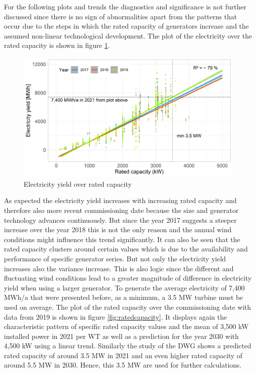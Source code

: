 \documentclass[a4paper,11pt]{article}
\begin{document}
For the following plots and trends the diagnostics and significance is not further discussed since there is no sign of abnormalities apart from the patterns that occur due to the steps in which the rated capacity of generators increase and the assumed non-linear technological development. The plot of the electricity over the rated capacity is shown in figure \ref{fig:eratedcapacity}.
\begin{figure}[H]

{\centering \includegraphics[width=1\linewidth]{data/Amprion/results_of_analysis/electricity_rated_capacity} 

}

\caption{Electricity yield over rated capacity}\label{fig:eratedcapacity}
\end{figure}
As expected the electricity yield increases with increasing rated capacity and therefore also more recent commissioning date because the size and generator technology advances continuously. But since the year 2017 suggests a steeper increase over the year 2018 this is not the only reason and the annual wind conditions might influence this trend significantly. It can also be seen that the rated capacity clusters around certain values which is due to the availability and performance of specific generator series. But not only the electricity yield increases also the variance increase. This is also logic since the different and fluctuating wind conditions lead to a greater magnitude of difference in electricity yield when using a larger generator. To generate the average electricity of 7,400 MWh/a that were presented before, as a minimum, a 3.5 MW turbine must be used on average. The plot of the rated capacity over the commissioning date with data from 2019 is shown in figure \ref{fig:ratedcapacity}. It displays again the characteristic pattern of specific rated capacity values and the mean of 3,500 kW installed power in 2021 per WT as well as a prediction for the year 2030 with 4,500 kW using a linear trend. Similarly the study of the DWG shows a predicted rated capacity of around 3.5 MW in 2021 and an even higher rated capacity of around 5.5 MW in 2030. Hence, this 3.5 MW are used for further calculations.
\end{document}
